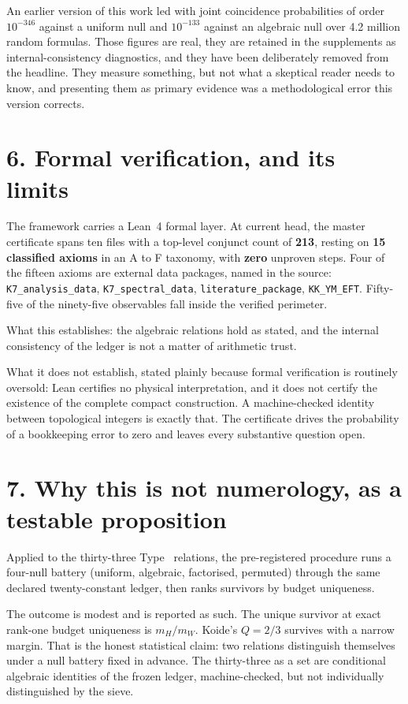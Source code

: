 \documentclass[11pt,a4paper]{article}
\begin{document}
An earlier version of this work led with joint coincidence probabilities
of order $10^{-346}$ against a uniform null and $10^{-133}$ against an
algebraic null over 4.2 million random formulas. Those figures are real,
they are retained in the supplements as internal-consistency diagnostics,
and they have been deliberately removed from the headline. They measure
something, but not what a skeptical reader needs to know, and presenting
them as primary evidence was a methodological error this version corrects.

\section{6. Formal verification, and its limits}

The framework carries a Lean~4 formal layer. At current head, the master
certificate spans ten files with a top-level conjunct count of
\textbf{213}, resting on \textbf{15 classified axioms} in an A to F
taxonomy, with \textbf{zero} unproven steps. Four of the fifteen axioms
are external data packages, named in the source:
\texttt{K7\_analysis\_data}, \texttt{K7\_spectral\_data},
\texttt{literature\_package}, \texttt{KK\_YM\_EFT}. Fifty-five of the
ninety-five observables fall inside the verified perimeter.

What this establishes: the algebraic relations hold as stated, and the
internal consistency of the ledger is not a matter of arithmetic trust.

What it does not establish, stated plainly because formal verification is
routinely oversold: Lean certifies no physical interpretation, and it does
not certify the existence of the complete compact construction. A
machine-checked identity between topological integers is exactly that. The
certificate drives the probability of a bookkeeping error to zero and
leaves every substantive question open.

\section{7. Why this is not numerology, as a testable proposition}

Applied to the thirty-three Type~\typeI{} relations, the pre-registered
procedure runs a four-null battery (uniform, algebraic, factorised,
permuted) through the same declared twenty-constant ledger, then ranks
survivors by budget uniqueness.

The outcome is modest and is reported as such. The unique survivor at
exact rank-one budget uniqueness is $m_H/m_W$. Koide's $Q = 2/3$ survives
with a narrow margin. That is the honest statistical claim: two relations
distinguish themselves under a null battery fixed in advance. The
thirty-three as a set are conditional algebraic identities of the frozen
ledger, machine-checked, but not individually distinguished by the sieve.
\end{document}
